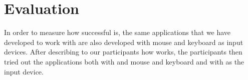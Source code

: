 \section{Evaluation}
In order to measure how successful \tube is, the same applications that we have developed to work with \tube are also developed with mouse and keyboard as input devices. After describing to our participants how \tube works, the participants then tried out the applications both with and mouse and keyboard and with \tube as the input device.

